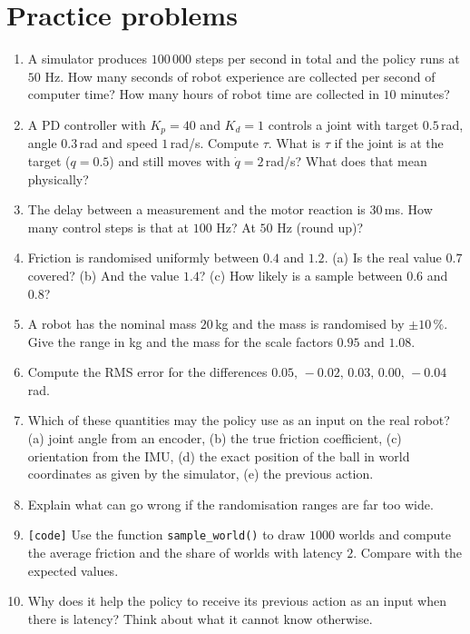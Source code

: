 \section*{Practice problems}
\begin{enumerate}[label=\textbf{\thechapter.\arabic*}]
  \item A simulator produces $100\,000$ steps per second in total and the policy runs at $50$ Hz. How many seconds of robot experience are collected per second of computer time? How many hours of robot time are collected in $10$ minutes?
  \item A PD controller with $K_p=40$ and $K_d=1$ controls a joint with target $0.5$\,rad, angle $0.3$\,rad and speed $1$\,rad/s. Compute $\tau$. What is $\tau$ if the joint is at the target ($q=0.5$) and still moves with $\dot q=2$\,rad/s? What does that mean physically?
  \item The delay between a measurement and the motor reaction is $30$\,ms. How many control steps is that at $100$ Hz? At $50$ Hz (round up)?
  \item Friction is randomised uniformly between $0.4$ and $1.2$. (a) Is the real value $0.7$ covered? (b) And the value $1.4$? (c) How likely is a sample between $0.6$ and $0.8$?
  \item A robot has the nominal mass $20$\,kg and the mass is randomised by $\pm10\,\%$. Give the range in kg and the mass for the scale factors $0.95$ and $1.08$.
  \item Compute the RMS error for the differences $0.05,\,-0.02,\,0.03,\,0.00,\,-0.04$\,rad.
  \item Which of these quantities may the policy use as an input on the real robot? (a) joint angle from an encoder, (b) the true friction coefficient, (c) orientation from the IMU, (d) the exact position of the ball in world coordinates as given by the simulator, (e) the previous action.
  \item Explain what can go wrong if the randomisation ranges are far too wide.
  \item[\textbf{\thechapter.9}] \texttt{[code]} Use the function \texttt{sample\_world()} to draw $1000$ worlds and compute the average friction and the share of worlds with latency $2$. Compare with the expected values.
  \item[\textbf{\thechapter.10}$\star$] Why does it help the policy to receive its previous action as an input when there is latency? Think about what it cannot know otherwise.
\end{enumerate}
